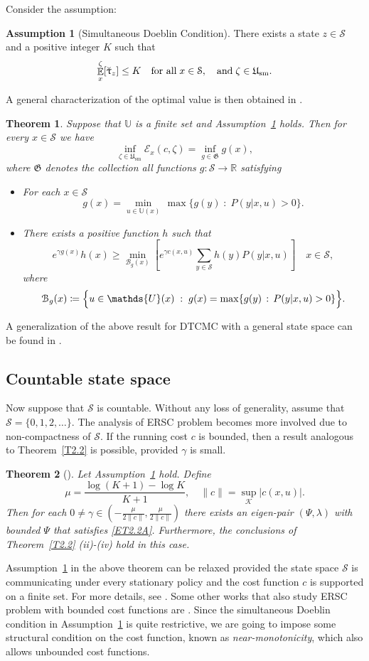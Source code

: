 \documentclass[notitlepage,11pt,reqno]{amsart}
\numberwithin{equation}{section}
\theoremstyle{plain}
\newtheorem{theorem}{Theorem}[section]
\theoremstyle{definition}
\newtheorem{assumption}{Assumption}[section]
\theoremstyle{remark}
\newcommand{\Act}{{\mathds{U}}}
\newcommand{\uuptau}{{\Breve{\uptau}}}
\newcommand{\sE}{{\mathscr{E}}}     %
\newcommand{\sK}{{\mathscr{K}}}
\newcommand{\cS}{{\mathcal{S}}}     %
\newcommand{\Usm}{\mathfrak{U}_{\mathrm{sm}}}
\newcommand{\RR}{\mathds{R}} %
\DeclareMathOperator{\Exp}{\mathbb{E}} %
\newcommand{\norm}[1]{\lVert#1\rVert}
\newcommand{\df}{\coloneqq}
\begin{document}
Consider the assumption:
\begin{assumption}[Simultaneous Doeblin Condition]\label{A2.2}
There exists a state $z\in\cS$ and a positive integer $K$ such that
$$\Exp_x^\zeta[\uuptau_z]\leq K\quad \text{for all}\; x\in\cS, \quad \text{and}\; \zeta\in\Usm.$$
\end{assumption}
A general characterization of the optimal value is then obtained in
\cite[Theorem~3.5]{MR2115041}.

\begin{theorem}
Suppose that $\Act$ is a finite set and Assumption~\ref{A2.2} holds.
Then for every $x\in\cS$ we have
$$\inf_{\zeta\in \Usm}\sE_x(c, \zeta)=\inf_{g\in\mathfrak{G}}g(x),$$
where $\mathfrak{G}$ denotes the collection all functions
$g:\cS\to\RR$ satisfying
\begin{itemize}
\item[(i)] For each $x\in\cS$
$$g(x)=\min_{u\in\Act(x)}\, \max\{g(y)\; :\; P(y|x, u)>0\}.$$
\item[(ii)] There exists a positive function $h$ such that
$$e^{\gamma g(x)}h(x)\geq \min_{\mathcal{B}_g(x)}\left[
e^{\gamma c(x, u)}\sum_{y\in\cS} h(y) P(y|x, u)\right]
\quad x\in\cS,$$
where
$$\mathcal{B}_g(x)\df
\Bigl\{u\in\Act(x)\; :\; g(x)=\max\{g(y)\, :\, P(y|x, u)>0\}\Bigr\}.$$
\end{itemize}
\end{theorem}
A generalization of the above result for DTCMC with a general state space can be found in \cite{MR2585141}.

\subsection{Countable state space}
Now suppose that $\cS$ is countable. Without any loss of generality,
assume that $\cS=\{0, 1, 2,\ldots\}$.
The analysis of ERSC problem becomes
more involved due to non-compactness of $\cS$. If the running
cost $c$ is bounded, then a result analogous to Theorem~\ref{T2.2}
is possible, provided $\gamma$ is small.

\begin{theorem}[\cite{MR1687362}]
Let Assumption~\ref{A2.2} hold. Define
$$
\mu=\frac{\log(K+1)-\log K}{K+1}, 
\quad \norm{c}=\sup_{\sK}|c(x, u)|.
$$
Then for each $0\neq \gamma\in (-\frac{\mu}{2\norm{c}}, \frac{\mu}{2\norm{c}})$ there exists an eigen-pair $(\Psi, \lambda)$
with bounded  $\Psi$ that satisfies \eqref{ET2.2A}. Furthermore,
the conclusions of Theorem~\ref{T2.2} (ii)-(iv) hold in this case.
\end{theorem}
Assumption~\ref{A2.2} in the above theorem can be relaxed provided 
the state space $\cS$ is communicating under every stationary policy
and the cost function $c$ is supported on a finite set. For more details,
see \cite{MR2595908}. Some other works that also study
ERSC problem with bounded cost functions are \cite{MR1629020,MR1795349}.
Since the simultaneous Doeblin condition in Assumption~\ref{A2.2} is
quite restrictive, we are going to impose some structural 
condition on the cost function, known as {\it near-monotonicity}, which
also allows unbounded cost functions.
\end{document}
